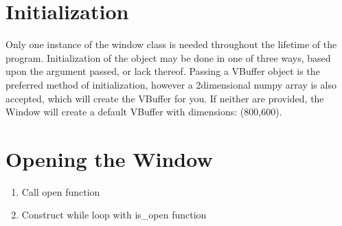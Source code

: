 \documentclass[letterpaper,10pt,english,openany,oneside]{sphinxmanual}
\begin{document}
\section{Initialization}
\label{\detokenize{fundamentals:id1}}
\sphinxAtStartPar
Only one instance of the window class is needed throughout the lifetime of the program. Initialization of the object may be done in one of three ways, based upon the argument passed, or lack thereof. Passing a VBuffer object is the preferred method of initialization, however a 2\sphinxhyphen{}dimensional numpy array is also accepted, which will create the VBuffer for you. If neither are provided, the Window will create a default VBuffer with dimensions: (800,600).
\def\sphinxLiteralBlockLabel{\label{\detokenize{fundamentals:id12}}}
\begin{sphinxVerbatim}[commandchars=\\\{\}]
   
   
\end{sphinxVerbatim}
\def\sphinxLiteralBlockLabel{\label{\detokenize{fundamentals:id13}}}
\begin{sphinxVerbatim}[commandchars=\\\{\}]
   
   
\end{sphinxVerbatim}
\def\sphinxLiteralBlockLabel{\label{\detokenize{fundamentals:id14}}}
\begin{sphinxVerbatim}[commandchars=\\\{\}]
   
\end{sphinxVerbatim}


\section{Opening the Window}
\label{\detokenize{fundamentals:opening-the-window}}\begin{enumerate}
%
\item {} 
\sphinxAtStartPar
Call open function

\item {} 
\sphinxAtStartPar
Construct while loop with is\_open function

\end{enumerate}
\end{document}
